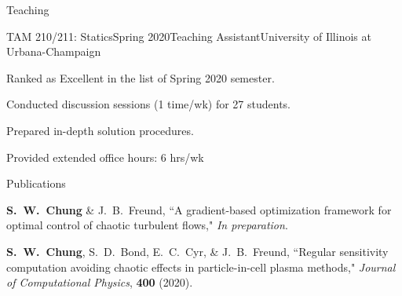 \documentclass{resume} %
\begin{document}
\begin{rSection}{Teaching}


\begin{rSubsection}{TAM 210/211: Statics}{Spring 2020}{Teaching Assistant}{University of Illinois at Urbana-Champaign}
\item Ranked as Excellent in the list of Spring 2020 semester.
\item Conducted discussion sessions (1 time/wk) for 27 students.
\item Prepared in-depth solution procedures.
\item Provided extended office hours: 6 hrs/wk
\end{rSubsection}


\end{rSection}

\begin{rSection}{Publications}
\par
\textbf{S.\ W.\ Chung} \& J.\ B.\ Freund,
``A gradient-based optimization framework for optimal control of chaotic turbulent flows,"
\textit{In preparation}.
\par
\textbf{S.\ W.\ Chung}, S.\ D.\ Bond, E.\ C.\ Cyr, \& J.\ B.\ Freund,
``Regular sensitivity computation avoiding chaotic effects in particle-in-cell plasma methods,"
\textit{Journal of Computational Physics}, \textbf{400} (2020).
\end{rSection}
\end{document}

